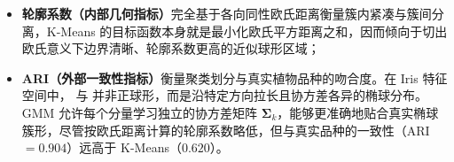 \begin{exercise}[title={K-Means 与 GMM 的极限联系及 Iris 实验剖析},level=advanced,points=18,tags={K-Means,GMM,EM算法,轮廓系数,ARI}]
\begin{solution}
\begin{enumerate}
\begin{itemize}
    \item \textbf{轮廓系数（内部几何指标）}完全基于各向同性欧氏距离衡量簇内紧凑与簇间分离，K-Means 的目标函数本身就是最小化欧氏平方距离之和，因而倾向于切出欧氏意义下边界清晰、轮廓系数更高的近似球形区域；
    \item \textbf{ARI（外部一致性指标）}衡量聚类划分与真实植物品种的吻合度。在 Iris 特征空间中， 与  并非正球形，而是沿特定方向拉长且协方差各异的椭球分布。GMM 允许每个分量学习独立的协方差矩阵 $\bm{\Sigma}_k$，能够更准确地贴合真实椭球簇形，尽管按欧氏距离计算的轮廓系数略低，但与真实品种的一致性（ARI $= 0.904$）远高于 K-Means（$0.620$）。
  \end{itemize}
\end{enumerate}
\end{solution}
\end{exercise}

